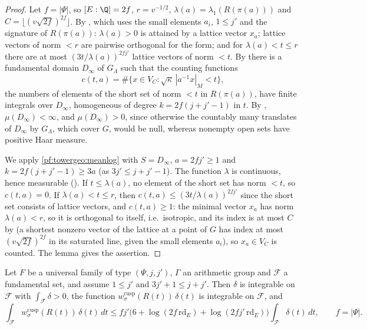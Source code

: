 \begin{proof}
Let $f=|\Psi|$, so $[E:\Q]=2f$, $r=v^{-1/2}$, $\lambda(a)=\lambda_1(R(\pi(a)))$ and
$C=\lfloor(v\sqrt{2f})^{2f}\rfloor$. By , which uses
the small elements $a_i$, $1\le j'$ and the signature of $R(\pi(a))$: $\lambda(a)>0$ is attained by a lattice vector
$x_a$; lattice vectors of norm $<r$ are pairwise orthogonal for the form; and for $\lambda(a)<t\le r$ there are at
most $(3t/\lambda(a))^{2fj'}$ lattice vectors of norm $<t$. By 
there is a fundamental domain $D_\infty$ of $G_\Lambda$ such that the counting functions
\[
c(t,a)=\#\{x\in V_C:\sqrt\kappa\,|a^{-1}x|_M<t\},
\]
the numbers of elements of the short set of norm $<t$ in $R(\pi(a))$, have finite integrals over $D_\infty$, homogeneous
of degree $k=2f(j+j'-1)$ in $t$. By ,
$\mu(D_\infty)<\infty$, and $\mu(D_\infty)>0$, since otherwise the countably many translates of $D_\infty$ by
$G_\Lambda$, which cover $G$, would be null, whereas nonempty open sets have positive Haar measure.

We apply \cref{pf:towergeo:meanlog} with $S=D_\infty$, $a=2fj'\ge1$ and $k=2f(j+j'-1)\ge3a$ (as $3j'\le j+j'-1$).
The function $\lambda$ is continuous, hence measurable
(). If $t\le\lambda(a)$, no element of the
short set has norm $<t$, so $c(t,a)=0$. If $\lambda(a)<t\le r$, then $c(t,a)\le(3t/\lambda(a))^{2fj'}$ since the short
set consists of lattice vectors, and $c(t,a)\ge1$: the minimal vector $x_a$ has norm $\lambda(a)<r$, so it is orthogonal
to itself, i.e.\ isotropic, and its index is at most $C$ by
 (a shortest nonzero vector of the
lattice at a point of $G$ has index at most $(v\sqrt{2f})^{2f}$ in its saturated line, given the small elements $a_i$), so
$x_a\in V_C$ is counted. The lemma gives the assertion.
\end{proof}

\begin{proposition}\label{pf:towergeo:cusp-fund}
Let $F$ be a universal family of type $(\Psi,j,j')$, $\Gamma$ an arithmetic group and $\mathcal F$ a
fundamental set, and assume $1\le j'$ and $3j'+1\le j+j'$. Then $\delta$ is integrable on $\mathcal F$ with
$\int_{\mathcal F}\delta>0$, the function $w^{\mathrm{cusp}}_\sigma(R(t))\,\delta(t)$ is integrable on
$\mathcal F$, and
\[
\int_{\mathcal F}w^{\mathrm{cusp}}_\sigma(R(t))\,\delta(t)\,dt\le
fj'\bigl(6+\log(2f\,\mathrm{rd}_E)+\log(2fj'\,\mathrm{rd}_E)\bigr)\int_{\mathcal F}\delta(t)\,dt,\qquad f=|\Psi|.
\]
\end{proposition}

